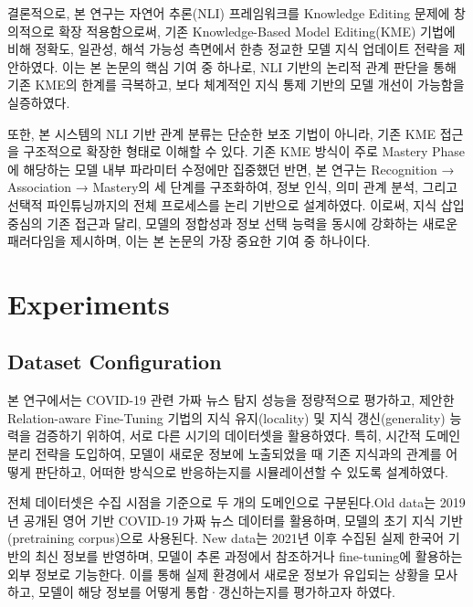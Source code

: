 \documentclass[a4paper,fleqn]{cas-sc}
\begin{document}
결론적으로, 본 연구는 자연어 추론(NLI) 프레임워크를 Knowledge Editing 문제에 창의적으로 확장 적용함으로써, 기존 Knowledge-Based Model Editing(KME) 기법에 비해 정확도, 일관성, 해석 가능성 측면에서 한층 정교한 모델 지식 업데이트 전략을 제안하였다. 이는 본 논문의 핵심 기여 중 하나로, NLI 기반의 논리적 관계 판단을 통해 기존 KME의 한계를 극복하고, 보다 체계적인 지식 통제 기반의 모델 개선이 가능함을 실증하였다.

또한, 본 시스템의 NLI 기반 관계 분류는 단순한 보조 기법이 아니라, 기존 KME 접근을 구조적으로 확장한 형태로 이해할 수 있다. 기존 KME 방식이 주로 Mastery Phase에 해당하는 모델 내부 파라미터 수정에만 집중했던 반면, 본 연구는 Recognition → Association → Mastery의 세 단계를 구조화하여, 정보 인식, 의미 관계 분석, 그리고 선택적 파인튜닝까지의 전체 프로세스를 논리 기반으로 설계하였다. 이로써, 지식 삽입 중심의 기존 접근과 달리, 모델의 정합성과 정보 선택 능력을 동시에 강화하는 새로운 패러다임을 제시하며, 이는 본 논문의 가장 중요한 기여 중 하나이다.







\section{Experiments}

\subsection{Dataset Configuration}

본 연구에서는 COVID-19 관련 가짜 뉴스 탐지 성능을 정량적으로 평가하고, 제안한 Relation-aware Fine-Tuning 기법의 지식 유지(locality) 및 지식 갱신(generality) 능력을 검증하기 위하여, 서로 다른 시기의 데이터셋을 활용하였다. 특히, 시간적 도메인 분리 전략을 도입하여, 모델이 새로운 정보에 노출되었을 때 기존 지식과의 관계를 어떻게 판단하고, 어떠한 방식으로 반응하는지를 시뮬레이션할 수 있도록 설계하였다.

전체 데이터셋은 수집 시점을 기준으로 두 개의 도메인으로 구분된다.Old data는 2019년 공개된 영어 기반 COVID-19 가짜 뉴스 데이터를 활용하며, 모델의 초기 지식 기반(pretraining corpus)으로 사용된다.  New data는 2021년 이후 수집된 실제 한국어 기반의 최신 정보를 반영하며, 모델이 추론 과정에서 참조하거나 fine-tuning에 활용하는 외부 정보로 기능한다.
이를 통해 실제 환경에서 새로운 정보가 유입되는 상황을 모사하고, 모델이 해당 정보를 어떻게 통합·갱신하는지를 평가하고자 하였다.
\end{document}
